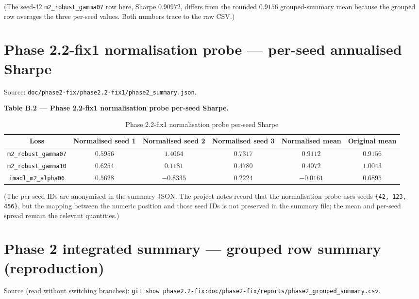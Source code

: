 (The seed-42 \texttt{m2\_robust\_gamma07} row here, Sharpe $0.90972$, differs from the rounded $0.9156$ grouped-summary mean because the grouped row averages the three per-seed values. Both numbers trace to the raw CSV.)

\section{Phase 2.2-fix1 normalisation probe --- per-seed annualised Sharpe}

\label{sec:phase22-fix1-normalisation-per-seed}

Source: \texttt{doc/phase2-fix/phase2.2-fix1/phase2\_summary.json}.

\textbf{Table B.2 --- Phase 2.2-fix1 normalisation probe per-seed Sharpe.}

\begin{table}[H]\centering
\caption{Phase 2.2-fix1 normalisation probe per-seed Sharpe}\label{tab:b2-norm-probe-per-seed}
\begin{tabular}{cccccc}\toprule
Loss & Normalised seed 1 & Normalised seed 2 & Normalised seed 3 & Normalised mean & Original mean \\\midrule
\texttt{m2\_robust\_gamma07} & $0.5956$ & $1.4064$ & $0.7317$ & $0.9112$ & $0.9156$ \\
\texttt{m2\_robust\_gamma10} & $0.6254$ & $0.1181$ & $0.4780$ & $0.4072$ & $1.0043$ \\
\texttt{imadl\_m2\_alpha06} & $0.5628$ & $-0.8335$ & $0.2224$ & $-0.0161$ & $0.6895$ \\
\bottomrule\end{tabular}
\end{table}

(The per-seed IDs are anonymised in the summary JSON. The project notes record that the normalisation probe uses seeds \texttt{\{42, 123, 456\}}, but the mapping between the numeric position and those seed IDs is not preserved in the summary file; the mean and per-seed spread remain the relevant quantities.)

\section{Phase 2 integrated summary --- grouped row summary (reproduction)}

\label{sec:phase2-integrated-summary}

Source (read without switching branches): \texttt{git show phase2.2-fix:doc/phase2-fix/reports/phase2\_grouped\_summary.csv}.

